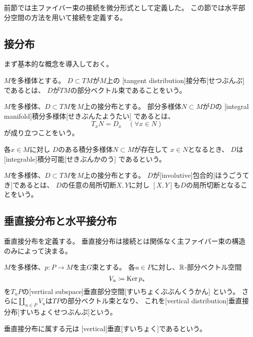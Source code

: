 \documentclass[report]{jlreq}
\begin{document}
前節では主ファイバー束の接続を微分形式として定義した。
この節では水平部分空間の方法を用いて接続を定義する。

\subsection{接分布}

まず基本的な概念を導入しておく。

\begin{definition}[接分布]
    $M$を多様体とする。
    $D \subset TM$が$M$上の
    [tangent distribution]{接分布}[せつぶんぷ]
    であるとは、
    $D$が$TM$の部分ベクトル束であることをいう。
\end{definition}

\begin{definition}[積分多様体]
    $M$を多様体、$D \subset TM$を$M$上の接分布とする。
    部分多様体$N \subset M$が$D$の
    [integral manifold]{積分多様体}[せきぶんたようたい]
    であるとは、
    \begin{equation}
        T_xN = D_x
            \quad
            (\forall x \in N)
    \end{equation}
    が成り立つことをいう。

    各$x \in M$に対し
    $D$のある積分多様体$N \subset M$が存在して
    $x \in N$となるとき、
    $D$は[integrable]{積分可能}[せきぶんかのう]
    であるという。
\end{definition}

\begin{definition}[包合的]
    $M$を多様体、$D \subset TM$を$M$上の接分布とする。
    $D$が[involutive]{包合的}[ほうごうてき]であるとは、
    $D$の任意の局所切断$X, Y$に対し
    $[X, Y]$も$D$の局所切断となることをいう。
\end{definition}

\begin{theorem}[Frobenius]
    \TODO{}
\end{theorem}

\subsection{垂直接分布と水平接分布}

垂直接分布を定義する。
垂直接分布は接続とは関係なく主ファイバー束の構造のみによって決まる。

\begin{definition}[垂直接分布]
    $M$を多様体、$p \colon P \to M$を主$G$束とする。
    各$u \in P$に対し、$\mathbb{R}$-部分ベクトル空間
    \begin{equation}
        V_u \coloneqq \operatorname{\mathrm{Ker}} p_*
    \end{equation}
    を$T_uP$の[vertical subspace]{垂直部分空間}[すいちょくぶぶんくうかん]
    という。
    さらに$\coprod_{u \in P} V_u$は$TP$の部分ベクトル束となり、
    これを[vertical distribution]{垂直接分布}[すいちょくせつぶんぷ]という。

    垂直接分布に属する元は
    [vertical]{垂直}[すいちょく]であるという。
\end{definition}
\end{document}

